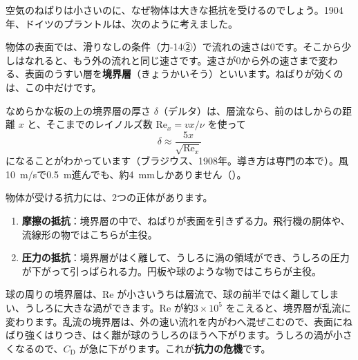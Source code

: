 \label{ph:力-15:sec8}空気のねばりは小さいのに、なぜ物体は大きな抵抗を受けるのでしょう。1904年、ドイツのプラントルは、次のように考えました。

物体の表面では、滑りなしの条件（力-14②）で流れの速さは0です。そこから少しはなれると、もう外の流れと同じ速さです。速さが0から外の速さまで変わる、表面のうすい層を\textbf{境界層}（きょうかいそう）といいます。ねばりが効くのは、この中だけです。

\begin{bkfigure}
\label{ph:力-15:fig-kyokai}
\end{bkfigure}

\noindent なめらかな板の上の境界層の厚さ $\delta$（デルタ）は、層流なら、前のはしからの距離 $x$ と、そこまでのレイノルズ数 $\mathrm{Re}_x=vx/\nu$ を使って
\[\delta\approx\frac{5x}{\sqrt{\mathrm{Re}_x}}\]
になることがわかっています（ブラジウス、1908年。導き方は専門の本で）。風\qty{10}{m/s}で\qty{0.5}{m}進んでも、約\qty{4}{mm}しかありません（\nobreak{}\nobreak）。

物体が受ける抗力には、2つの正体があります。
\begin{enumerate}[label={\bkcircled{\arabic*}}, leftmargin=2.4\zw, itemsep=1pt, topsep=2pt]
\item \textbf{摩擦の抵抗}：境界層の中で、ねばりが表面を引きずる力。飛行機の胴体や、流線形の物ではこちらが主役。
\item \textbf{圧力の抵抗}：境界層がはく離して、うしろに渦の領域ができ、うしろの圧力が下がって引っぱられる力。円板や球のような物ではこちらが主役。
\end{enumerate}

球の周りの境界層は、Re が小さいうちは層流で、球の前半ではく離してしまい、うしろに大きな渦ができます。Re が約$3\times10^5$ をこえると、境界層が乱流に変わります。乱流の境界層は、外の速い流れを内がわへ混ぜこむので、表面にねばり強くはりつき、はく離が球のうしろのほうへ下がります。うしろの渦が小さくなるので、$C_{\mathrm D}$ が急に下がります。これが\textbf{抗力の危機}です。

